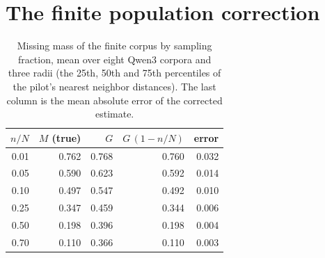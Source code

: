 \begin{table}[t]
\centering
\small
{}
\caption{Probes of the collapse failure. Near duplicates: percentage of a 5{,}000-document sample with a neighbor within cosine distance 0.02. Local $d$: range of the TwoNN dimension over twenty $k$-means clusters, and its coefficient of variation.}
\label{tab:probe}
\end{table}

\section{The finite population correction}
\label{app:fpc}

\begin{table}[t]
\centering
\small
\begin{tabular}{rrrrr}
\toprule
$n/N$ & $M$ (true) & $G$ & $G\,(1 - n/N)$ & error \\
\midrule
0.01 & 0.762 & 0.768 & 0.760 & 0.032 \\
0.05 & 0.590 & 0.623 & 0.592 & 0.014 \\
0.10 & 0.497 & 0.547 & 0.492 & 0.010 \\
0.25 & 0.347 & 0.459 & 0.344 & 0.006 \\
0.50 & 0.198 & 0.396 & 0.198 & 0.004 \\
0.70 & 0.110 & 0.366 & 0.110 & 0.003 \\
\bottomrule
\end{tabular}
\caption{Missing mass of the finite corpus by sampling fraction, mean over eight Qwen3 corpora and three radii (the 25th, 50th and 75th percentiles of the pilot's nearest neighbor distances). The last column is the mean absolute error of the corrected estimate.}
\label{tab:fpc}
\end{table}


